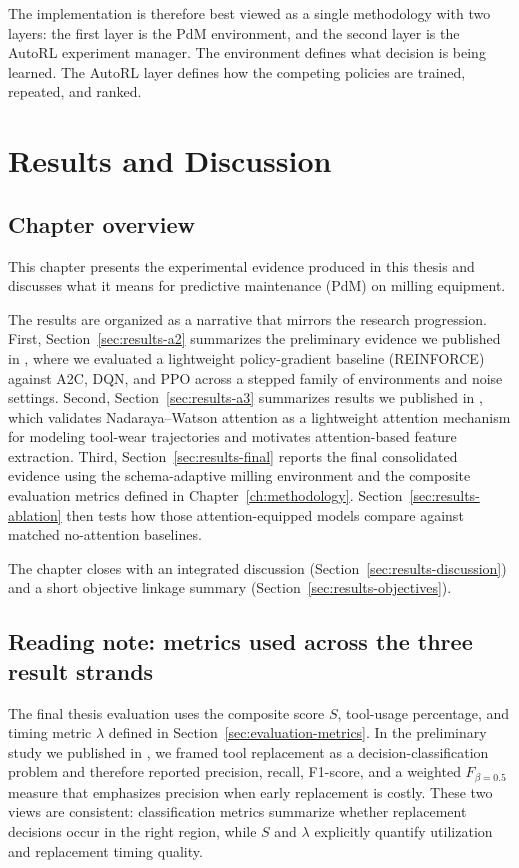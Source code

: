 \documentclass[12pt,oneside]{book}
\begin{document}
The implementation is therefore best viewed as a single methodology with two layers: the first layer is the PdM environment, and the second layer is the AutoRL experiment manager. The environment defines what decision is being learned. The AutoRL layer defines how the competing policies are trained, repeated, and ranked.



\chapter{Results and Discussion}\label{ch:results}
\onehalfspacing

\section{Chapter overview}
This chapter presents the experimental evidence produced in this thesis and discusses what it means for predictive maintenance (PdM) on milling equipment.

The results are organized as a narrative that mirrors the research progression. First, Section~\ref{sec:results-a2} summarizes the preliminary evidence we published in \cite{Siraskar2025}, where we evaluated a lightweight policy-gradient baseline (\textsc{REINFORCE}) against \textsc{A2C}, \textsc{DQN}, and \textsc{PPO} across a stepped family of environments and noise settings. Second, Section~\ref{sec:results-a3} summarizes results we published in \cite{Siraskar2024NW}, which validates Nadaraya--Watson attention as a lightweight attention mechanism for modeling tool-wear trajectories and motivates attention-based feature extraction. Third, Section~\ref{sec:results-final} reports the final consolidated evidence using the schema-adaptive milling environment and the composite evaluation metrics defined in Chapter~\ref{ch:methodology}. Section~\ref{sec:results-ablation} then tests how those attention-equipped models compare against matched no-attention baselines.

The chapter closes with an integrated discussion (Section~\ref{sec:results-discussion}) and a short objective linkage summary (Section~\ref{sec:results-objectives}).

\section{Reading note: metrics used across the three result strands}
The final thesis evaluation uses the composite score $S$, tool-usage percentage, and timing metric $\lambda$ defined in Section~\ref{sec:evaluation-metrics}. In the preliminary study we published in \cite{Siraskar2025}, we framed tool replacement as a decision-classification problem and therefore reported precision, recall, F1-score, and a weighted $F_{\beta=0.5}$ measure that emphasizes precision when early replacement is costly. These two views are consistent: classification metrics summarize whether replacement decisions occur in the right region, while $S$ and $\lambda$ explicitly quantify utilization and replacement timing quality.
\end{document}
